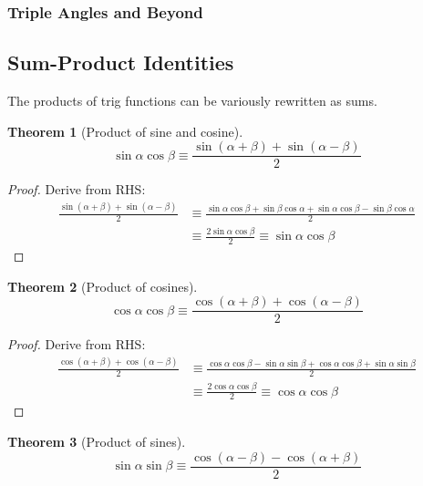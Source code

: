 \documentclass[fleqn,a4paper,11pt]{article}
\newtheorem{theorem}{Theorem}[section]
\begin{document}
    \subsubsection{Triple Angles and Beyond}

    \subsection{Sum-Product Identities} \label{sec_trig_sum_product}

    The products of trig functions can be variously rewritten as sums.

    \begin{theorem}[Product of sine and cosine]
    \begin{equation*}
    \sin \alpha \cos \beta \equiv
        \frac{\sin(\alpha + \beta) + \sin(\alpha - \beta)} 2
    \end{equation*}
    \end{theorem}
    \begin{proof}
    Derive from RHS:
    \begin{align*}
    \frac{\sin(\alpha + \beta) + \sin(\alpha - \beta)} 2 &\equiv
     \frac{\sin \alpha \cos \beta + \sin \beta \cos \alpha +
           \sin \alpha \cos \beta - \sin \beta \cos \alpha} 2 \\
    &\equiv \frac{2 \sin \alpha \cos \beta} 2 \equiv \sin \alpha \cos \beta
    \end{align*}
    \end{proof}
    \begin{theorem}[Product of cosines]
    \begin{equation*}
    \cos \alpha \cos \beta \equiv
     \frac{\cos(\alpha + \beta) + \cos(\alpha - \beta)} 2
    \end{equation*}
    \end{theorem}
    \begin{proof}
    Derive from RHS:
    \begin{align*}
    \frac{\cos(\alpha + \beta) + \cos(\alpha - \beta)} 2 &\equiv
     \frac{\cos \alpha \cos \beta - \sin \alpha \sin \beta +
           \cos \alpha \cos \beta + \sin \alpha \sin \beta} 2 \\
    &\equiv \frac{2 \cos \alpha \cos \beta} 2 \equiv \cos \alpha \cos \beta
    \end{align*}
    \end{proof}
    \begin{theorem}[Product of sines]
    \begin{equation*}
    \sin \alpha \sin \beta \equiv
     \frac{\cos(\alpha - \beta) - \cos(\alpha + \beta)} 2
    \end{equation*}
    \end{theorem}
\end{document}
